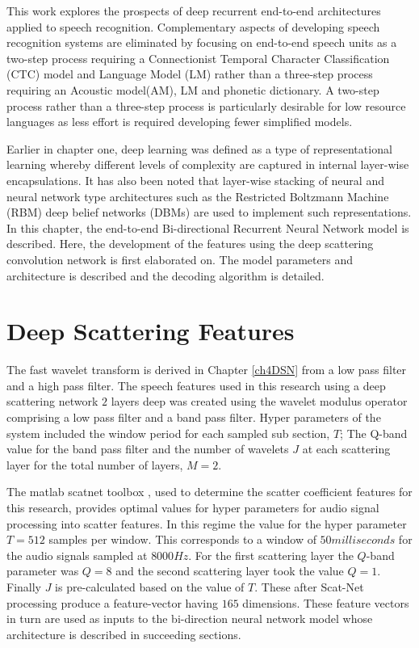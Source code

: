 This work explores the prospects of deep recurrent end-to-end architectures applied to speech recognition. Complementary aspects of developing speech recognition systems are eliminated by focusing on end-to-end speech units as a two-step process requiring a Connectionist Temporal Character Classification (CTC)\citep{graves2006connectionist} model and Language Model (LM) rather than a three-step process requiring an Acoustic model(AM), LM and phonetic dictionary. A two-step process rather than a three-step process is particularly desirable for low resource languages as less effort is required developing fewer simplified models.

Earlier in chapter one, deep learning was defined as a type of representational learning whereby different levels of complexity are captured in internal layer-wise encapsulations. It has also been noted that layer-wise stacking of neural and neural network type architectures such as the Restricted Boltzmann Machine (RBM) deep belief networks (DBMs) are used to implement such representations. In this chapter, the end-to-end Bi-directional Recurrent Neural Network model is described. Here, the development of the features using the deep scattering convolution network is first elaborated on. The model parameters and architecture is described and the decoding algorithm is detailed.

\section{Deep Scattering Features}
The fast wavelet transform is derived in Chapter \ref{ch4DSN} from a low pass filter and a high pass filter.  The speech features used in this research using a deep scattering network $2$ layers deep was created using the wavelet modulus operator comprising a low pass filter and a band pass filter.  Hyper parameters of the system included the window period for each sampled sub section, $T$;  The Q-band value for the band pass filter and the number of wavelets $J$ at each scattering layer for the total number of layers, $M=2$.

The matlab scatnet toolbox \citep{anden2014scatnet}, used to determine the scatter coefficient features for this research, provides optimal values for hyper parameters for audio signal processing into scatter features.  In this regime the value for the hyper parameter $T=512$ samples per window. This corresponds to a window of $50 milliseconds$ for the audio signals sampled at $8000 Hz$.  For the first scattering layer the $Q$-band parameter was $Q=8$ and the second scattering layer took the value  $Q=1$.  Finally $J$ is pre-calculated based on the value of $T$.  These after Scat-Net processing produce a feature-vector having $165$  dimensions.  These feature vectors in turn are used as inputs to the bi-direction neural network model whose architecture is described in  succeeding sections.

